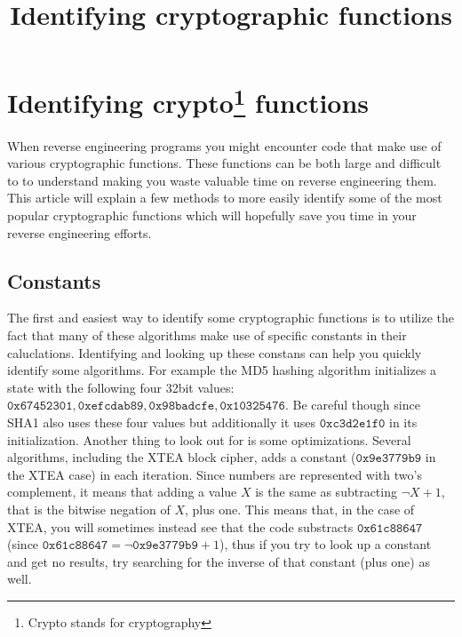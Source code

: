 \documentclass[twocolumn]{article}
\begin{document}
\title{Identifying cryptographic functions}
\date{}
\section*{Identifying crypto\footnote{Crypto stands for cryptography} functions}

When reverse engineering programs you might encounter code that make use of various cryptographic functions. These functions can be both large and difficult to to understand making you waste valuable time on reverse engineering them. This article will explain a few methods to more easily identify some of the most popular cryptographic functions which will hopefully save you time in your reverse engineering efforts.
\vspace*{-1.4\baselineskip}


\subsection*{Constants}
\vspace*{-0.2\baselineskip}

The first and easiest way to identify some cryptographic functions is to utilize the fact that many of these algorithms make use of specific constants in their caluclations. Identifying and looking up these constans can help you quickly identify some algorithms. For example the MD5 hashing algorithm initializes a state with the following four 32bit values: $\mathtt{0x67452301, 0xefcdab89, 0x98badcfe, 0x10325476}$. Be careful though since SHA1 also uses these four values but additionally it uses $\mathtt{0xc3d2e1f0}$ in its initialization. Another thing to look out for is some optimizations. Several algorithms, including the XTEA block cipher, adds a constant ($\mathtt{0x9e3779b9}$ in the XTEA case) in each iteration. Since numbers are represented with two's complement, it means that adding a value $X$ is the same as subtracting $\lnot X+1$, that is the bitwise negation of $X$, plus one. This means that, in the case of XTEA, you will sometimes instead see that the code substracts $\mathtt{0x61c88647}$ (since $\mathtt{0x61c88647} =  \lnot\mathtt{0x9e3779b9}+1$), thus if you try to look up a constant and get no results, try searching for the inverse of that constant (plus one) as well.
\vspace*{-0.7\baselineskip}
\end{document}
